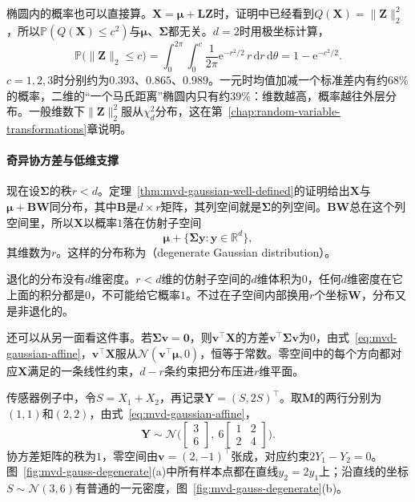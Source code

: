 椭圆内的概率也可以直接算。$\bm{X}=\bm{\mu}+\bm{L}\bm{Z}$时，证明中已经看到$Q(\bm{X})=\lVert\bm{Z}\rVert_2^{2}$，所以$\mathbb{P}(Q(\bm{X})\leq c^{2})$与$\bm{\mu}$、$\bm{\Sigma}$都无关。$d=2$时用极坐标计算，
\[
 \mathbb{P}\bigl(\lVert\bm{Z}\rVert_2\leq c\bigr)=\int_0^{2\pi}\!\!\int_0^{c}\frac{1}{2\pi}\mathrm{e}^{-r^{2}/2}\,r\,\mathrm{d}r\,\mathrm{d}\theta=1-\mathrm{e}^{-c^{2}/2} .
\]
$c=1,2,3$时分别约为$0.393$、$0.865$、$0.989$。一元时均值加减一个标准差内有约$68\%$的概率，二维的“一个马氏距离”椭圆内只有约$39\%$：维数越高，概率越往外层分布。一般维数下$\lVert\bm{Z}\rVert_2^{2}$服从$\chi^2_d$分布，这在第~\ref{chap:random-variable-transformations}章说明。

\paragraph{奇异协方差与低维支撑}
现在设$\bm{\Sigma}$的秩$r<d$。定理~\ref{thm:mvd-gaussian-well-defined}的证明给出$\bm{X}$与$\bm{\mu}+\bm{B}\bm{W}$同分布，其中$\bm{B}$是$d\times r$矩阵，其列空间就是$\bm{\Sigma}$的列空间。$\bm{B}\bm{W}$总在这个列空间里，所以$\bm{X}$以概率$1$落在仿射子空间
\[
 \bm{\mu}+\{\bm{\Sigma}\bm{y}:\bm{y}\in\mathbb{R}^{d}\},
\]
其维数为$r$。这样的分布称为（degenerate Gaussian distribution）。

退化的分布没有$d$维密度。$r<d$维的仿射子空间的$d$维体积为$0$，任何$d$维密度在它上面的积分都是$0$，不可能给它概率$1$。不过在子空间内部换用$r$个坐标$\bm{W}$，分布又是非退化的。

还可以从另一面看这件事。若$\bm{\Sigma}\bm{v}=\bm{0}$，则$\bm{v}^{\top}\bm{X}$的方差$\bm{v}^{\top}\bm{\Sigma}\bm{v}$为$0$，由式~\eqref{eq:mvd-gaussian-affine}，$\bm{v}^{\top}\bm{X}$服从$\mathcal{N}(\bm{v}^{\top}\bm{\mu},0)$，恒等于常数。零空间中的每个方向都对应$\bm{X}$满足的一条线性约束，$d-r$条约束把分布压进$r$维平面。

传感器例子中，令$S=X_1+X_2$，再记录$\bm{Y}=(S,2S)^{\top}$。取$\bm{M}$的两行分别为$(1,1)$和$(2,2)$，由式~\eqref{eq:mvd-gaussian-affine}，
\[
 \bm{Y}\sim\mathcal{N}\Biggl(\begin{bmatrix}3\\6\end{bmatrix},\ 6\begin{bmatrix}1&2\\2&4\end{bmatrix}\Biggr) .
\]
协方差矩阵的秩为$1$，零空间由$\bm{v}=(2,-1)^{\top}$张成，对应约束$2Y_1-Y_2=0$。图~\ref{fig:mvd-gauss-degenerate}(a)中所有样本点都在直线$y_2=2y_1$上；沿直线的坐标$S\sim\mathcal{N}(3,6)$有普通的一元密度，图~\ref{fig:mvd-gauss-degenerate}(b)。

